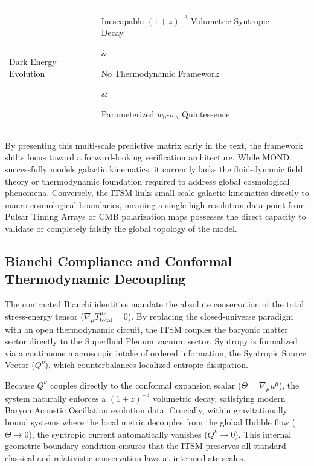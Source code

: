 \documentclass[aps,prd,10pt,twocolumn,superscriptaddress,nofootinbib]{revtex4-2}
\begin{document}
\begin{table}[htbp]
\begin{ruledtabular}
\begin{tabular}{l|l|l|l}
Dark Energy Evolution & \parbox[t]{4.5cm}{Inescapable $(1+z)^{-3}$ Volumetric Syntropic Decay\vspace{1.5mm}} & \parbox[t]{3.5cm}{No Thermodynamic Framework\vspace{1.5mm}} & \parbox[t]{4cm}{Parameterized $w_0$-$w_a$ Quintessence\vspace{1.5mm}} \\
\end{tabular}
\end{ruledtabular}
\end{table}

By presenting this multi-scale predictive matrix early in the text, the framework shifts focus toward a forward-looking verification architecture. While MOND successfully models galactic kinematics, it currently lacks the fluid-dynamic field theory or thermodynamic foundation required to address global cosmological phenomena. Conversely, the ITSM links small-scale galactic kinematics directly to macro-cosmological boundaries, meaning a single high-resolution data point from Pulsar Timing Arrays or CMB polarization maps possesses the direct capacity to validate or completely falsify the global topology of the model.

\subsection{\label{sec:bianchi}Bianchi Compliance and Conformal Thermodynamic Decoupling}

The contracted Bianchi identities mandate the absolute conservation of the total stress-energy tensor ($\nabla_\mu T_{\text{total}}^{\mu\nu} = 0$). By replacing the closed-universe paradigm with an open thermodynamic circuit, the ITSM couples the baryonic matter sector directly to the Superfluid Plenum vacuum sector. Syntropy is formalized via a continuous macroscopic intake of ordered information, the Syntropic Source Vector ($Q^\nu$), which counterbalances localized entropic dissipation. 

Because $Q^\nu$ couples directly to the conformal expansion scalar ($\Theta = \nabla_\mu u^\mu$), the system naturally enforces a $(1+z)^{-3}$ volumetric decay, satisfying modern Baryon Acoustic Oscillation evolution data. Crucially, within gravitationally bound systems where the local metric decouples from the global Hubble flow ($\Theta \to 0$), the syntropic current automatically vanishes ($Q^\nu \to 0$). This internal geometric boundary condition ensures that the ITSM preserves all standard classical and relativistic conservation laws at intermediate scales.
\end{document}
